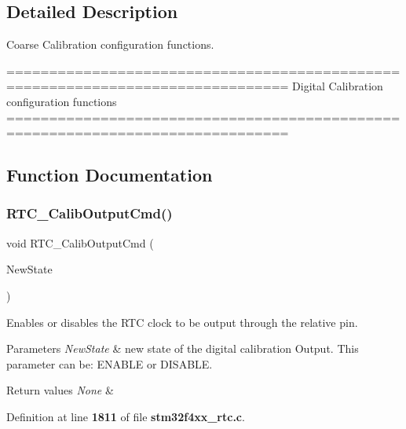 \subsection{Detailed Description}
Coarse Calibration configuration functions. 

\begin{DoxyVerb} ===============================================================================
                  Digital Calibration configuration functions
 ===============================================================================  \end{DoxyVerb}
 

\subsection{Function Documentation}
\mbox{\label{group__RTC__Group7_ga25eaa2de5ee858a4572d5fb1eb146ff8}} 
\subsubsection{R\+T\+C\+\_\+\+Calib\+Output\+Cmd()}
{\footnotesize\ttfamily void R\+T\+C\+\_\+\+Calib\+Output\+Cmd (\begin{DoxyParamCaption}\item[{\textbf{ Functional\+State}}]{New\+State }\end{DoxyParamCaption})}



Enables or disables the R\+TC clock to be output through the relative pin. 


\begin{DoxyParams}{Parameters}
{\em New\+State} & new state of the digital calibration Output. This parameter can be\+: E\+N\+A\+B\+LE or D\+I\+S\+A\+B\+LE. \\
\hline
\end{DoxyParams}

\begin{DoxyRetVals}{Return values}
{\em None} & \\
\hline
\end{DoxyRetVals}


Definition at line \textbf{ 1811} of file \textbf{ stm32f4xx\+\_\+rtc.\+c}.



